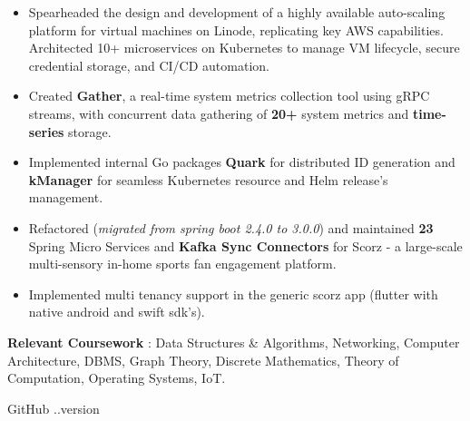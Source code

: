 \documentclass[10pt,a4paper,ragged2e]{classes/altacv}
\begin{document}
\begin{itemize}[itemsep=6pt]
\normalsize

\item Spearheaded the design and development of a highly available auto-scaling platform for virtual machines on Linode, replicating key AWS capabilities. Architected 10+ microservices on Kubernetes to manage VM lifecycle, secure credential storage, and CI/CD automation.

\item Created \textbf{Gather}, a real-time system metrics collection tool using gRPC streams, with concurrent data gathering of \textbf{20+} system metrics and \textbf{time-series} storage.

\item Implemented internal Go packages \textbf{Quark} for distributed ID generation and \textbf{kManager} for seamless Kubernetes resource and Helm release's management.

\end{itemize}
\vspace{6pt}

\begin{itemize}[itemsep=6pt]
\normalsize
\item Refactored (\textit{migrated from spring boot 2.4.0 to 3.0.0}) and maintained \textbf{23} Spring Micro Services and \textbf{Kafka Sync Connectors} for Scorz - a large-scale multi-sensory in-home sports fan engagement platform.
\item Implemented multi tenancy support in the generic scorz app (flutter with native android and swift sdk's).
\end{itemize}

\smallskip
\normalsize
\textbf{Relevant Coursework} : Data Structures \& Algorithms, Networking, Computer Architecture, DBMS, Graph Theory, Discrete Mathematics, Theory of Computation, Operating Systems, IoT.

\vspace{16pt}
\smallskip
\begin{footnotesize}
GitHub \number \month .\number\year.version
\end{footnotesize}

\clearpage
\end{document}
